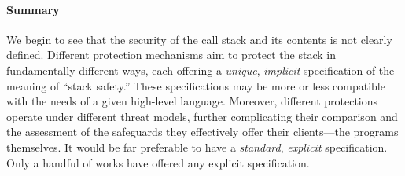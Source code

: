 \paragraph{Summary}

We begin to see that the security of the call stack and its contents is not
clearly defined. Different protection mechanisms aim to protect the stack
in fundamentally different ways, each offering a \emph{unique}, \emph{implicit}
specification of the meaning of ``stack safety.'' These specifications
may be more or less compatible with the needs of a given high-level language.
Moreover, different protections operate under different threat models, further
complicating their comparison and the assessment of the safeguards they
effectively offer their clients---the programs themselves.
It would be far preferable to have a \emph{standard}, \emph{explicit} specification.
Only a handful of works have offered any explicit specification.
